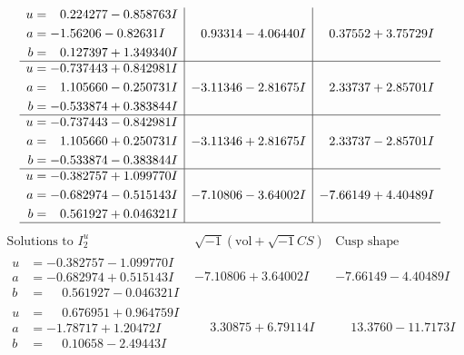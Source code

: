 \documentclass[1p]{elsarticle_modified}
\theoremstyle{definition}
\newcommand{\I}{\sqrt{-1}}
\begin{document}
$$\begin{array}{c|c|c}
\begin{aligned}
u &= \phantom{-}0.224277 - 0.858763 I \\
a &= -1.56206 - 0.82631 I \\
b &= \phantom{-}0.127397 + 1.349340 I\end{aligned}
 & \phantom{-}0.93314 - 4.06440 I & \phantom{-}0.37552 + 3.75729 I \\ \hline\begin{aligned}
u &= -0.737443 + 0.842981 I \\
a &= \phantom{-}1.105660 - 0.250731 I \\
b &= -0.533874 + 0.383844 I\end{aligned}
 & -3.11346 - 2.81675 I & \phantom{-}2.33737 + 2.85701 I \\ \hline\begin{aligned}
u &= -0.737443 - 0.842981 I \\
a &= \phantom{-}1.105660 + 0.250731 I \\
b &= -0.533874 - 0.383844 I\end{aligned}
 & -3.11346 + 2.81675 I & \phantom{-}2.33737 - 2.85701 I \\ \hline\begin{aligned}
u &= -0.382757 + 1.099770 I \\
a &= -0.682974 - 0.515143 I \\
b &= \phantom{-}0.561927 + 0.046321 I\end{aligned}
 & -7.10806 - 3.64002 I & -7.66149 + 4.40489 I\\
 \hline 
 \end{array}$$\newpage$$\begin{array}{c|c|c}  
\text{Solutions to }I^u_{2}& \I (\text{vol} + \sqrt{-1}CS) & \text{Cusp shape}\\
 \hline 
\begin{aligned}
u &= -0.382757 - 1.099770 I \\
a &= -0.682974 + 0.515143 I \\
b &= \phantom{-}0.561927 - 0.046321 I\end{aligned}
 & -7.10806 + 3.64002 I & -7.66149 - 4.40489 I \\ \hline\begin{aligned}
u &= \phantom{-}0.676951 + 0.964759 I \\
a &= -1.78717 + 1.20472 I \\
b &= \phantom{-}0.10658 - 2.49443 I\end{aligned}
 & \phantom{-}3.30875 + 6.79114 I & \phantom{-}13.3760 - 11.7173 I \\ \hline\begin{aligned}

\end{aligned}
\end{array}$$
\end{document}
